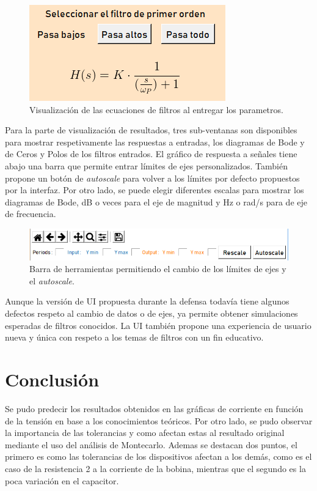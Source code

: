 \documentclass[a4paper]{article}
\begin{document}
\begin{figure}[h]
\begin{center}
\includegraphics[scale=0.6]{EcuacionUI}
\caption{Visualización de las ecuaciones de filtros al entregar los parametros.}
\end{center}
\end{figure}

Para la parte de visualización de resultados, tres sub-ventanas son disponibles para mostrar respetivamente las respuestas a entradas, los diagramas de Bode y de Ceros y Polos de los filtros entrados.
El gráfico de respuesta a señales tiene abajo una barra que permite entrar límites de ejes personalizados. También propone un botón de \textit{autoscale} para volver a los límites por defecto propuestos por la interfaz. Por otro lado, se puede elegir diferentes escalas para mostrar los diagramas de Bode, dB o veces para el eje de magnitud y Hz o rad/s para de eje de frecuencia.

\begin{figure}[h]
\begin{center}
\includegraphics[scale=0.7]{RescaleUI}
\caption{Barra de herramientas permitiendo el cambio de los límites de ejes y el \textit{autoscale}.}
\end{center}
\end{figure}

Aunque la versión de UI propuesta durante la defensa todavía tiene algunos defectos respeto al cambio de datos o de ejes, ya permite obtener simulaciones esperadas de filtros conocidos. La UI también propone una experiencia de usuario nueva y única con respeto a los temas de filtros con un fin educativo.

\section*{Conclusión}

Se pudo predecir los resultados obtenidos en las gráficas de corriente en función de la tensión en base a los conocimientos teóricos. Por otro lado, se pudo observar la importancia de las tolerancias y como afectan estas al resultado original mediante el uso del análisis de Montecarlo. Ademas se destacan dos puntos, el primero es como las tolerancias de los dispositivos afectan a los demás, como es el caso de la resistencia 2 a la corriente de la bobina, mientras que el segundo es la poca variación en el capacitor. 
\end{document}
